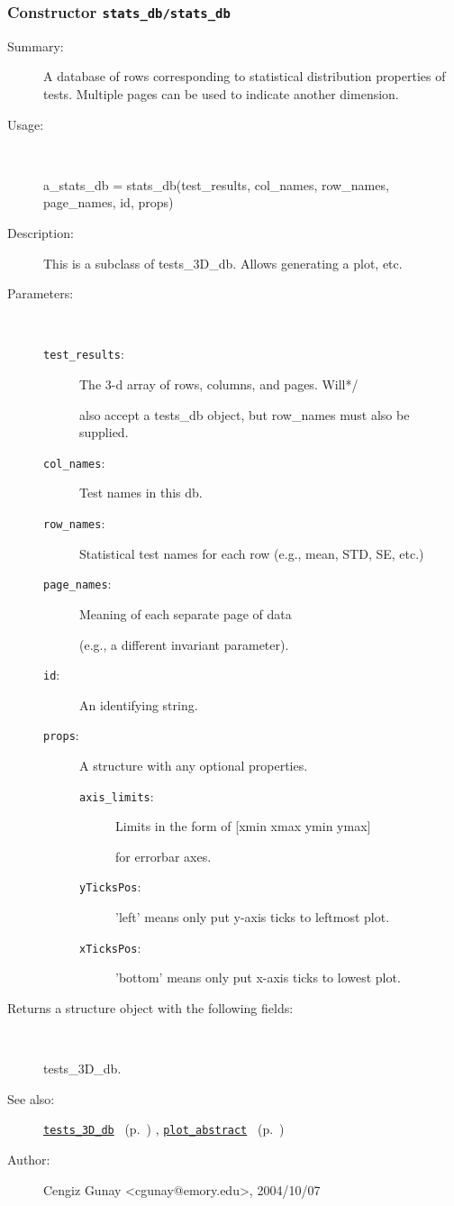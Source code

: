 \subsubsection[Constructor \texttt{stats\_db}]{Constructor \texttt{stats\_db/stats\_db}}%
%
\label{ref_stats_db__stats_db}%
\hypertarget{ref_stats_db__stats_db}{}%
\begin{description}
\item[Summary:]A database of rows corresponding to statistical distribution
		properties of tests. Multiple pages can be used to
		indicate another dimension.
%
\item[Usage:]~%
\begin{lyxcode}%
a\_stats\_db = stats\_db(test\_results, col\_names, row\_names, page\_names, 
			id, props)
%
\end{lyxcode}%
%
\item[Description:]%
This is a subclass of tests\_3D\_db. Allows generating a plot, etc.
\item[Parameters:]~
\begin{description}%
\item[\texttt{test\_results}:]
 The 3-d array of rows, columns, and pages. Will*/

also accept a tests\_db object, but row\_names must also be supplied.
\item[\texttt{col\_names}:]
 Test names in this db.
\item[\texttt{row\_names}:]
 Statistical test names for each row (e.g., mean, STD, SE, etc.)
\item[\texttt{page\_names}:]
 Meaning of each separate page of data 

(e.g., a different invariant parameter).
\item[\texttt{id}:]
 An identifying string.
\item[\texttt{props}:]
 A structure with any optional properties.
\begin{description}%
\item[\texttt{axis\_limits}:]
 Limits in the form of [xmin xmax ymin ymax]

for errorbar axes.
\item[\texttt{yTicksPos}:]
 'left' means only put y-axis ticks to leftmost plot.
\item[\texttt{xTicksPos}:]
 'bottom' means only put x-axis ticks to lowest plot.
\end{description}%
\end{description}%
%
\item[Returns a structure object with the following fields:
]~

	tests\_3D\_db.
%
%
\item[See also:]%
\hyperlink{ref_tests_3D_db}{\texttt{tests\_3D\_db}}%
\ (p.~\pageref{ref_tests_3D_db})%
%
, \hyperlink{ref_plot_abstract}{\texttt{plot\_abstract}}%
\ (p.~\pageref{ref_plot_abstract})%
%
%
\item[Author:]%
Cengiz Gunay <cgunay@emory.edu>, 2004/10/07
%
\end{description}
\methodline%
